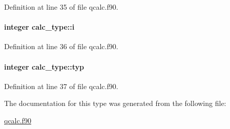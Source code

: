 Definition at line 35 of file qcalc.\-f90.

\hypertarget{structcalc__type_a30aaeaab9272f5ff5cdaeb3c3fe8c8bf}{
\paragraph[{i}]{\setlength{\rightskip}{0pt plus 5cm}integer calc\-\_\-type\-::i}}\label{structcalc__type_a30aaeaab9272f5ff5cdaeb3c3fe8c8bf}


Definition at line 36 of file qcalc.\-f90.

\hypertarget{structcalc__type_adf6e4b278e6edf39f7a833d329f1f493}{
\paragraph[{typ}]{\setlength{\rightskip}{0pt plus 5cm}integer calc\-\_\-type\-::typ}}\label{structcalc__type_adf6e4b278e6edf39f7a833d329f1f493}


Definition at line 37 of file qcalc.\-f90.



The documentation for this type was generated from the following file\-:\begin{DoxyCompactItemize}
\item 
\hyperlink{qcalc_8f90}{qcalc.\-f90}\end{DoxyCompactItemize}
